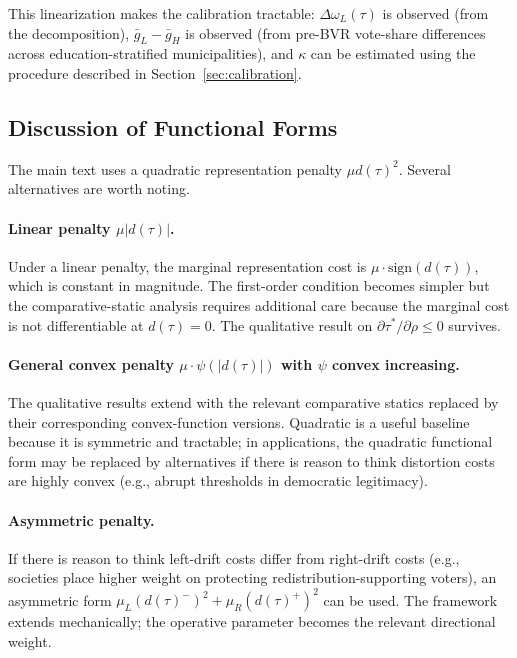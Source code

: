 This linearization makes the calibration tractable: $\Delta\omega_L(\tau)$ is observed (from the decomposition), $\bar g_L - \bar g_H$ is observed (from pre-BVR vote-share differences across education-stratified municipalities), and $\kappa$ can be estimated using the procedure described in Section~\ref{sec:calibration}.

\subsection{Discussion of Functional Forms}
\label{ssec:functional_forms}

The main text uses a quadratic representation penalty $\mu d(\tau)^2$. Several alternatives are worth noting.

\paragraph{Linear penalty $\mu |d(\tau)|$.} Under a linear penalty, the marginal representation cost is $\mu \cdot \text{sign}(d(\tau))$, which is constant in magnitude. The first-order condition becomes simpler but the comparative-static analysis requires additional care because the marginal cost is not differentiable at $d(\tau) = 0$. The qualitative result on $\partial \tau^*/\partial \rho \leq 0$ survives.

\paragraph{General convex penalty $\mu \cdot \psi(|d(\tau)|)$ with $\psi$ convex increasing.} The qualitative results extend with the relevant comparative statics replaced by their corresponding convex-function versions. Quadratic is a useful baseline because it is symmetric and tractable; in applications, the quadratic functional form may be replaced by alternatives if there is reason to think distortion costs are highly convex (e.g., abrupt thresholds in democratic legitimacy).

\paragraph{Asymmetric penalty.} If there is reason to think left-drift costs differ from right-drift costs (e.g., societies place higher weight on protecting redistribution-supporting voters), an asymmetric form $\mu_L (d(\tau)^-)^2 + \mu_R (d(\tau)^+)^2$ can be used. The framework extends mechanically; the operative parameter becomes the relevant directional weight.

